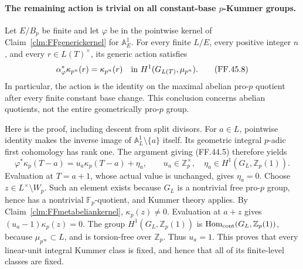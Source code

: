 \paragraph{The remaining action is trivial on all constant-base \(p\)-Kummer groups.}
Let \(E/B_p\) be finite and let \(\varphi\) be in the
pointwise kernel of Claim~\ref{clm:FFgenerickernel} for
\(\mathbb A^1_E\). For every finite \(L/E\), every
positive integer \(n\), and every \(r\in L(T)^\times\),
its generic action satisfies
\[
       \alpha_\varphi^*\kappa_{p^n}(r)
                         =\kappa_{p^n}(r)
              \quad\hbox{in }H^1(G_{L(T)},\mu_{p^n}).
                                                        \tag{FF.45.8}
\]
In particular, the action is the identity on the maximal
abelian pro-\(p\) quotient after every finite constant
base change. This conclusion concerns abelian quotients,
not the entire geometrically pro-\(p\) group.

Here is the proof, including descent from split divisors.
For \(a\in L\), pointwise identity makes the inverse
image of \(\mathbb A^1_L\setminus\{a\}\) itself.
Its geometric integral \(p\)-adic first cohomology has
rank one. The argument giving (FF.44.5) therefore yields
\[
 \varphi^*\kappa_p(T-a)
       =u_a\kappa_p(T-a)+\eta_a,
 \qquad u_a\in\mathbb Z_p^\times,
 \quad\eta_a\in H^1(G_L,\mathbb Z_p(1)).
                                                        \tag{FF.45.9}
\]
Evaluation at \(T=a+1\), whose actual value is unchanged,
gives \(\eta_a=0\). Choose \(z\in L^\times\setminus
W_p\). Such an element exists because \(G_L\) is a
nontrivial free pro-\(p\) group, hence has a nontrivial
\(\mathbb F_p\)-quotient, and Kummer theory applies.
By Claim~\ref{clm:FFmetabeliankernel},
\(\kappa_p(z)\ne0\). Evaluation at \(a+z\) gives
\((u_a-1)\kappa_p(z)=0\). The group
\(H^1(G_L,\mathbb Z_p(1))\) is
\(\operatorname{Hom}_{\rm cont}(G_L,\mathbb Z_p(1))\),
because \(\mu_{p^\infty}\subset L\), and is
torsion-free over \(\mathbb Z_p\). Thus \(u_a=1\).
This proves that every linear-unit integral Kummer class
is fixed, and hence that all of its finite-level classes
are fixed.

